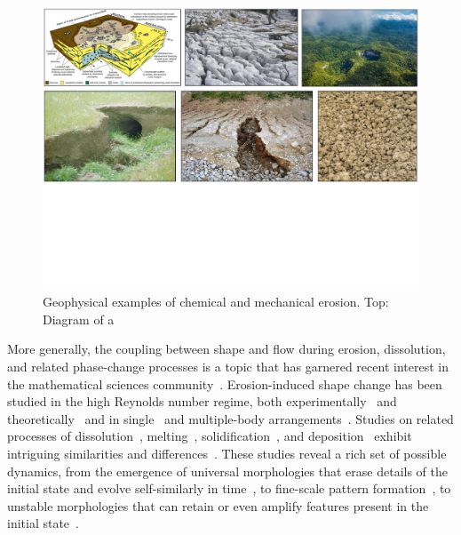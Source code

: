 \documentclass[11pt]{article}
\begin{document}
\begin{figure}%
\begin{center}
\includegraphics[width = 0.99 \textwidth]{./figs/collage.pdf}
\caption{\label{fig1} Geophysical examples of chemical and mechanical erosion. Top: Diagram of a 
}
\end{center}
\end{figure}

More generally, the coupling between shape and flow during erosion, dissolution, and related phase-change processes is a topic that has garnered recent interest in the mathematical sciences community~\cite{Ristroph2012, rycroft2016asymmetric, cohen2016erosion, MooreCPAM2017, mitchell2017generalized, Quaife2018, wykes2018self, lachaussee2018competitive, lopez2018cfd, ristroph2018sculpting}.  Erosion-induced shape change has been studied in the high Reynolds number regime, both experimentally~\cite{Ristroph2012, MoorePOF2013} and theoretically~\cite{MoorePOF2013, MooreCPAM2017, hewett2017evolution} and in single~\cite{Ristroph2012, MoorePOF2013, MooreCPAM2017, lachaussee2018competitive} and multiple-body arrangements~\cite{hewett2017evolution}.  Studies on related processes of dissolution~\cite{HuangJFM2015, kondratiuk2015steadily, cohen2016erosion, claudin2017dissolution, wykes2018self, huang2017solute}, melting~\cite{Cummings1999, back2014effect, rycroft2016asymmetric, hewett2017pear, MooreCPAM2017, toppaladoddi2018combined, hewett2019evolution, favier2019rayleigh}, solidification~\cite{Huppert90, Anderson95, Cummings1999, mccue2003extinction}, and deposition~\cite{hewett2018modelling} exhibit intriguing similarities and differences~\cite{MooreCPAM2017}.  These studies reveal a rich set of possible dynamics, from the emergence of universal morphologies that erase details of the initial state and evolve self-similarly in time~\cite{MoorePOF2013, MooreCPAM2017, hewett2017pear}, to fine-scale pattern formation~\cite{cohen2016erosion, claudin2017dissolution, huang2017solute}, to unstable morphologies that can retain or even amplify features present in the initial state~\cite{claudin2017dissolution, wykes2018self}.
	
\end{document}

